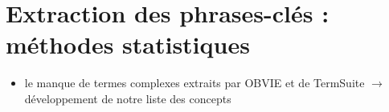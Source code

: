 











\section{Extraction des phrases-clés : méthodes statistiques}
\label{sect:methodo_stat}

\begin{tcolorbox}[colback=yellow!10!white,colframe=red!75!black,title=agenda]
	\begin{itemize}
		\item le manque de termes complexes extraits par OBVIE et de TermSuite $\rightarrow$ développement de notre liste des concepts
	\end{itemize}
\end{tcolorbox}


